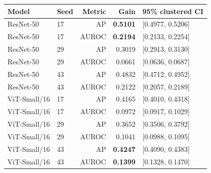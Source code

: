 \begin{tabular}{llrrl}
\toprule
Model & Seed & Metric & Gain & 95\% clustered CI \\
\midrule
ResNet-50 & 17 & AP & \textbf{0.5101} & [0.4977, 0.5206] \\
ResNet-50 & 17 & AUROC & \textbf{0.2194} & [0.2133, 0.2254] \\
ResNet-50 & 29 & AP & 0.3019 & [0.2913, 0.3130] \\
ResNet-50 & 29 & AUROC & 0.0661 & [0.0636, 0.0687] \\
ResNet-50 & 43 & AP & 0.4832 & [0.4712, 0.4952] \\
ResNet-50 & 43 & AUROC & 0.2122 & [0.2057, 0.2189] \\
ViT-Small/16 & 17 & AP & 0.4165 & [0.4010, 0.4318] \\
ViT-Small/16 & 17 & AUROC & 0.0972 & [0.0917, 0.1029] \\
ViT-Small/16 & 29 & AP & 0.3652 & [0.3506, 0.3792] \\
ViT-Small/16 & 29 & AUROC & 0.1041 & [0.0988, 0.1095] \\
ViT-Small/16 & 43 & AP & \textbf{0.4247} & [0.4090, 0.4383] \\
ViT-Small/16 & 43 & AUROC & \textbf{0.1399} & [0.1328, 0.1470] \\
\bottomrule
\end{tabular}
